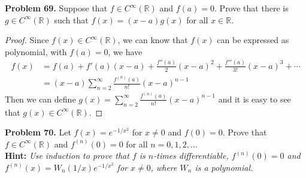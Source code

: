 \documentclass[12pt,leqno]{amsart}
\begin{document}
\medskip

\noindent
{\bf Problem 69.}
Suppose that $f\in C^\infty(\mathbb{R})$ and $f(a)=0$. Prove that there is $g\in C^\infty(\mathbb{R})$ such that $f(x)=(x-a)g(x)$ for all $x\in\mathbb{R}$.
\begin{proof}
Since $f(x)\in C^\infty(\mathbb{R})$, we can know that $f(x)$ can be expressed as polynomial, with $f(a) = 0$, we have
\begin{align*}
    f(x) & = f(a) + f'(a)(x-a) + \frac{f''(a)}{2}(x-a)^2 + \frac{f'''(a)}{3!}(x-a)^3 + \cdots \\
    & = (x-a)\sum^\infty_{n=2}\frac{f^{(n)}(a)}{n!}(x-a)^{n-1}
\end{align*}
Then we can define $g(x) = \sum^\infty_{n=2}\frac{f^{(n)}(a)}{n!}(x-a)^{n-1}$ and it is easy to see that $g(x)\in C^\infty(\mathbb{R})$.
\end{proof}

\medskip

\noindent
{\bf Problem 70.}
Let $f(x)=e^{-1/x^2}$ for $x\neq 0$ and $f(0)=0$. Prove that $f\in C^\infty(\mathbb{R})$ and $f^{(n)}(0)=0$ for all $n=0,1,2,\ldots$\\
{\bf Hint:} {\em Use induction to prove that $f$ is $n$-times differentiable, $f^{(n)}(0)=0$ and $f^{(n)}(x)=W_n(1/x)e^{-1/x^2}$ for $x\neq 0$, where $W_n$ is a polynomial.}
\end{document}
